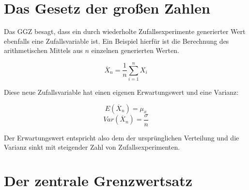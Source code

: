 


  
  
  

\section{Das Gesetz der großen Zahlen}

Das GGZ besagt, dass ein durch wiederholte Zufallsexperimente generierter Wert ebenfalls eine Zufallsvariable ist.
Ein Beispiel hierfür ist die Berechnung des arithmetischen Mittels aus $n$ einzelnen generierten Werten.

\[\overline{X}_n = \frac{1}{n}\sum^n_{i=1}X_i\]

Diese neue Zufallsvariable hat einen eigenen Erwartungswert und eine Varianz:

\[E(\overline{X}_n) = \mu_x\]
\[Var(\overline{X}_n) = \frac{\sigma}{n}\]

Der Erwartungswert entspricht also dem der ursprünglichen Verteilung und die Varianz sinkt mit steigender Zahl von Zufallsexperimenten.

\section{Der zentrale Grenzwertsatz}

